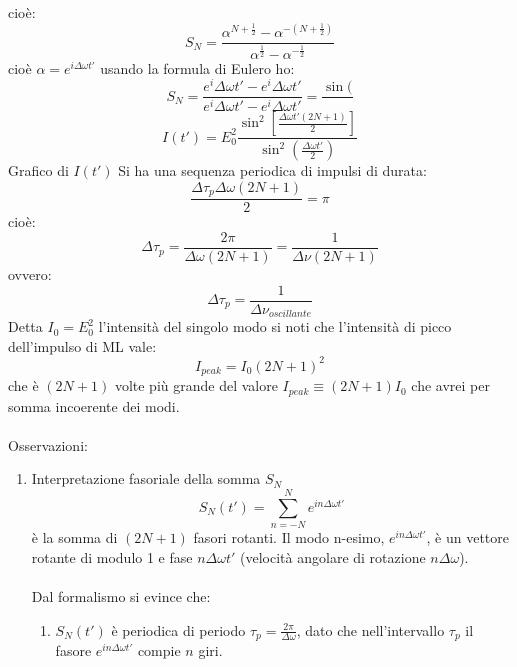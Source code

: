 \documentclass{book}
\def \w {\omega}
\def \D {\Delta}
\theoremstyle{remark}
\begin{document}
\begin{enumerate}
cioè:
\begin{equation*}
S_N = \frac{\alpha^{N+\frac{1}{2}} - \alpha^{-(N+\frac{1}{2})}}{\alpha^\frac{1}{2} - \alpha^{-\frac{1}{2}}}
\end{equation*}
cioè $\alpha = e^{i\D \omega t'}$ usando la formula di Eulero ho:
\begin{equation*}
S_N = \frac{e^i\D \omega t' -e^i\D \omega t'}{e^i\D \omega t' - e^i\D \omega t'} = \frac{\sin(}{}
\end{equation*}
\begin{equation*}
I(t') = E_0^2 \frac{\sin^2 \left[\frac{\D \omega t' (2N+1)}{2}\right]}{\sin^2 \left(\frac{\D\omega t'}{2}\right)}
\end{equation*}
Grafico di $I(t')$
Si ha una sequenza periodica di impulsi di durata:
\begin{equation*}
\frac{\D\tau_p \D\omega (2N+1)}{2} = \pi
\end{equation*}
cioè:
\begin{equation*}
\D\tau_p = \frac{2\pi}{\D\omega (2N+1)} = \frac{1}{\D\nu(2N+1)}
\end{equation*}
ovvero:
\begin{equation*}
\D\tau_p = \frac{1}{\D\nu_{oscillante}}
\end{equation*}
Detta $I_0 = E_0^2$ l'intensità del singolo modo si noti che l'intensità di picco dell'impulso di ML vale:
\begin{equation*}
I_{peak} = I_0 (2N+1)^2
\end{equation*}
che è $(2N+1)$ volte più grande del valore $I_{peak} \equiv (2N+1) I_0$ che avrei per somma incoerente dei modi.\\
\\
Osservazioni:
\begin{enumerate}
\item Interpretazione fasoriale della somma $S_N$
\begin{equation*}
S_N(t') = \sum_{n=-N}^N e^{in\D\omega t'}
\end{equation*}
è la somma di $(2N+1)$ fasori rotanti.
Il modo n-esimo, $e^{in\D\omega t'}$, è un vettore rotante di modulo 1 e fase $n\D\omega t'$ (velocità angolare di rotazione $n\D\w$).\\
\\
Dal formalismo si evince che:
\begin{enumerate}
\item $S_N(t')$ è periodica di periodo $\tau_p = \frac{2\pi}{\D\omega}$, dato che nell'intervallo $\tau_p$ il fasore $e^{in\D\omega t'}$ compie $n$ giri.

\end{enumerate}
\end{enumerate}
\end{enumerate}
\end{document}
